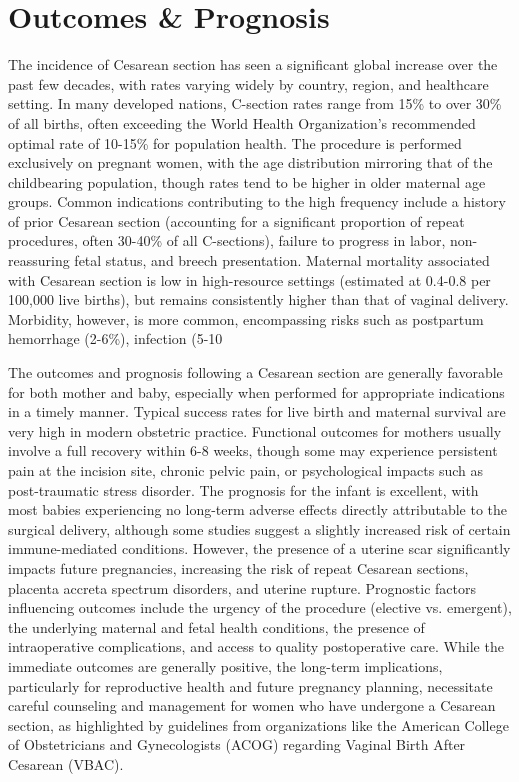 \section*{Outcomes \& Prognosis}
The incidence of Cesarean section has seen a significant global increase over the past few decades, with rates varying widely by country, region, and healthcare setting. In many developed nations, C-section rates range from 15\% to over 30\% of all births, often exceeding the World Health Organization's recommended optimal rate of 10-15\% for population health. The procedure is performed exclusively on pregnant women, with the age distribution mirroring that of the childbearing population, though rates tend to be higher in older maternal age groups. Common indications contributing to the high frequency include a history of prior Cesarean section (accounting for a significant proportion of repeat procedures, often 30-40\% of all C-sections), failure to progress in labor, non-reassuring fetal status, and breech presentation. Maternal mortality associated with Cesarean section is low in high-resource settings (estimated at 0.4-0.8 per 100,000 live births), but remains consistently higher than that of vaginal delivery. Morbidity, however, is more common, encompassing risks such as postpartum hemorrhage (2-6\%), infection (5-10%

The outcomes and prognosis following a Cesarean section are generally favorable for both mother and baby, especially when performed for appropriate indications in a timely manner. Typical success rates for live birth and maternal survival are very high in modern obstetric practice. Functional outcomes for mothers usually involve a full recovery within 6-8 weeks, though some may experience persistent pain at the incision site, chronic pelvic pain, or psychological impacts such as post-traumatic stress disorder. The prognosis for the infant is excellent, with most babies experiencing no long-term adverse effects directly attributable to the surgical delivery, although some studies suggest a slightly increased risk of certain immune-mediated conditions. However, the presence of a uterine scar significantly impacts future pregnancies, increasing the risk of repeat Cesarean sections, placenta accreta spectrum disorders, and uterine rupture. Prognostic factors influencing outcomes include the urgency of the procedure (elective vs. emergent), the underlying maternal and fetal health conditions, the presence of intraoperative complications, and access to quality postoperative care. While the immediate outcomes are generally positive, the long-term implications, particularly for reproductive health and future pregnancy planning, necessitate careful counseling and management for women who have undergone a Cesarean section, as highlighted by guidelines from organizations like the American College of Obstetricians and Gynecologists (ACOG) regarding Vaginal Birth After Cesarean (VBAC).

